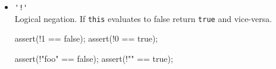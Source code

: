 \begin{itemize}

\item \lstinline|'!'|\\
  Logical negation. If \lstinline|this| evaluates to false return
  \lstinline|true| and vice-versa.
\begin{urbiscript}[firstnumber=last]
assert(!1 == false);
assert(!0 == true);

assert(!"foo" == false);
assert(!"" ==    true);
\end{urbiscript}
\end{itemize}

